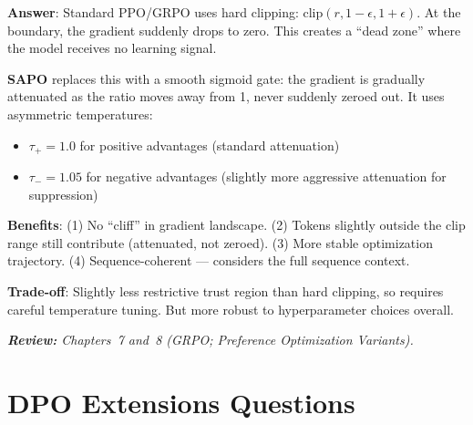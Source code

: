 \begin{questionbox}
\textbf{Answer}: Standard PPO/GRPO uses hard clipping: $\text{clip}(r, 1-\epsilon, 1+\epsilon)$. At the boundary, the gradient suddenly drops to zero. This creates a ``dead zone'' where the model receives no learning signal.

\textbf{SAPO} replaces this with a smooth sigmoid gate: the gradient is gradually attenuated as the ratio moves away from 1, never suddenly zeroed out. It uses asymmetric temperatures:

\begin{itemize}
  \item $\tau_+ = 1.0$ for positive advantages (standard attenuation)
  \item $\tau_- = 1.05$ for negative advantages (slightly more aggressive attenuation for suppression)
\end{itemize}

\textbf{Benefits}: (1) No ``cliff'' in gradient landscape. (2) Tokens slightly outside the clip range still contribute (attenuated, not zeroed). (3) More stable optimization trajectory. (4) Sequence-coherent --- considers the full sequence context.

\textbf{Trade-off}: Slightly less restrictive trust region than hard clipping, so requires careful temperature tuning. But more robust to hyperparameter choices overall.

\emph{\textbf{Review:} Chapters~7 and~8 (GRPO; Preference Optimization Variants).}
\end{questionbox}

\section{DPO Extensions Questions}
\label{dpo-extensions-questions}

